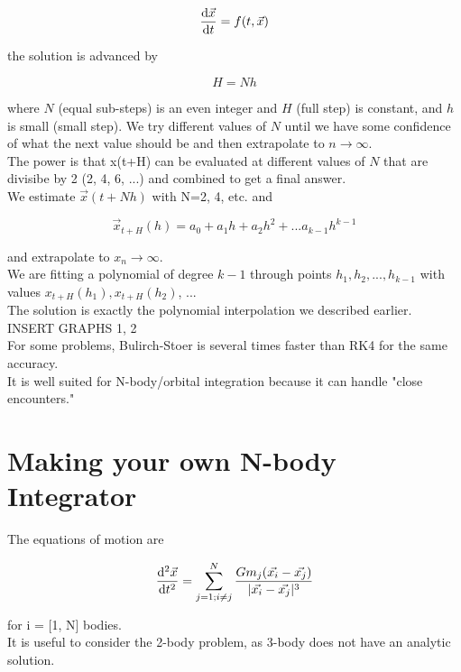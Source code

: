 \documentclass[]{article}
\begin{document}
\[\dv{\vec{x}}{t} = f(t, \vec{x}) \]

the solution is advanced by

\[H = Nh\]

where $N$ (equal sub-steps) is an even integer and $H$ (full step) is constant, and $h$ is small (small step). We try different values of $N$ until we have some confidence of what the next value should be and then extrapolate to $n \to \infty$.\\

The power is that x(t+H) can be evaluated at different values of $N$ that are divisibe by 2 (2, 4, 6, ...) and combined to get a final answer. \\

We estimate $\vec{x}(t+Nh)$ with N=2, 4, etc. and 

\[\vec{x}_{t+H}(h) = a_0 + a_1h + a_2h^2 + ... a_{k-1}h^{k-1}\]

and extrapolate to $x_n \to \infty$.\\

We are fitting a polynomial of degree $k-1$ through points $h_1, h_2, ..., h_{k-1}$ with values $x_{t+H}(h_1), x_{t+H}(h_2)$, ...\\

The solution is exactly the polynomial interpolation we described earlier.\\

INSERT GRAPHS 1, 2\\

For some problems, Bulirch-Stoer is several times faster than RK4 for the same accuracy.\\

It is well suited for N-body/orbital integration because it can handle "close encounters."\\

\section{Making your own N-body Integrator}\bigbreak\bigbreak

The equations of motion are

\[\dv[2]{\vec{x}}{t} = \sum_{j=1; i\neq j}^{N}\frac{Gm_j(\vec{x_i} - \vec{x_j})}{|\vec{x_i} - \vec{x_j}|^3}\]

for i = [1, N] bodies.\\

It is useful to consider the 2-body problem, as 3-body does not have an analytic solution.\\
\end{document}
